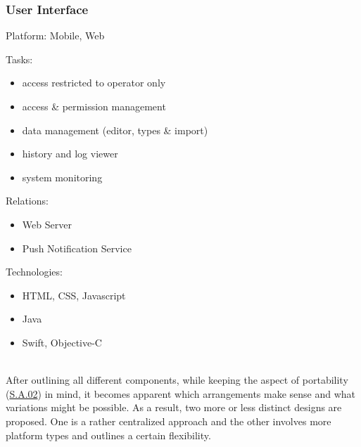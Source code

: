 \documentclass[12pt,english,a4paper,titlepage,cleardoublepage=empty,dottedtoc]{report}
\providecommand{\tightlist}{%
  \setlength{\itemsep}{0pt}\setlength{\parskip}{0pt}}
\begin{document}
\newpage

\subsubsection*{User Interface}\label{user-interface}

Platform: Mobile, Web

Tasks:

\begin{itemize}
\tightlist
\item
  access restricted to operator only
\item
  access \& permission management
\item
  data management (editor, types \& import)
\item
  history and log viewer
\item
  system monitoring
\end{itemize}

Relations:

\begin{itemize}
\tightlist
\item
  Web Server
\item
  Push Notification Service
\end{itemize}

Technologies:

\begin{itemize}
\tightlist
\item
  HTML, CSS, Javascript
\item
  Java
\item
  Swift, Objective-C
\end{itemize}

~\\
After outlining all different components, while keeping the aspect of
portability (\protect\hyperlink{sa02}{S.A.02}) in mind, it becomes
apparent which arrangements make sense and what variations might be
possible. As a result, two more or less distinct designs are proposed.
One is a rather centralized approach and the other involves more
platform types and outlines a certain flexibility.
\end{document}
